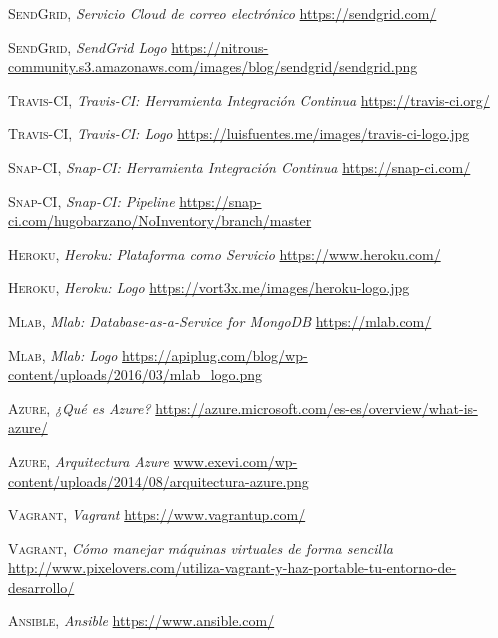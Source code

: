 \documentclass[a4paper,11pt]{book}
\begin{document}
\begin{thebibliography}{aaaa}
 \textsc{SendGrid},
\textit{Servicio Cloud de correo electrónico }
\url{https://sendgrid.com/}

 \textsc{SendGrid},
\textit{SendGrid Logo}
\url{https://nitrous-community.s3.amazonaws.com/images/blog/sendgrid/sendgrid.png}







 \textsc{Travis-CI},
\textit{Travis-CI: Herramienta Integración Continua}
\url{https://travis-ci.org/}

 \textsc{Travis-CI},
\textit{Travis-CI: Logo}
\url{https://luisfuentes.me/images/travis-ci-logo.jpg}


 \textsc{Snap-CI},
\textit{Snap-CI: Herramienta Integración Continua}
\url{https://snap-ci.com/}

 \textsc{Snap-CI},
\textit{Snap-CI: Pipeline}
\url{https://snap-ci.com/hugobarzano/NoInventory/branch/master}


 \textsc{Heroku},
\textit{Heroku: Plataforma como Servicio}
\url{https://www.heroku.com/}

 \textsc{Heroku},
\textit{Heroku: Logo}
\url{https://vort3x.me/images/heroku-logo.jpg}

 \textsc{Mlab},
\textit{Mlab: Database-as-a-Service for MongoDB}
\url{https://mlab.com/}

 \textsc{Mlab},
\textit{Mlab: Logo}
\url{https://apiplug.com/blog/wp-content/uploads/2016/03/mlab_logo.png}



 \textsc{Azure},
\textit{¿Qué es Azure?}
\url{https://azure.microsoft.com/es-es/overview/what-is-azure/} 

 \textsc{Azure},
\textit{Arquitectura Azure}
\url{www.exevi.com/wp-content/uploads/2014/08/arquitectura-azure.png} 



 \textsc{Vagrant},
\textit{Vagrant}
\url{https://www.vagrantup.com/} 

 \textsc{Vagrant},
\textit{Cómo manejar máquinas virtuales de forma sencilla}
\url{http://www.pixelovers.com/utiliza-vagrant-y-haz-portable-tu-entorno-de-desarrollo/} 


 \textsc{Ansible},
\textit{Ansible}
\url{https://www.ansible.com/} 


\end{thebibliography}
\end{document}
